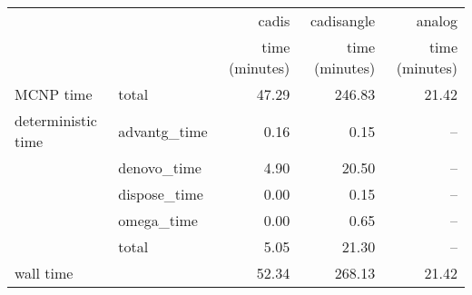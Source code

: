 \begin{tabular}{llrrr}
\toprule
          &              &          cadis &     cadisangle &         analog \\
          &              & time (minutes) & time (minutes) & time (minutes) \\
\midrule
MCNP time & total &          47.29 &         246.83 &          21.42 \\
deterministic time & advantg\_time &           0.16 &           0.15 &            -- \\
          & denovo\_time &           4.90 &          20.50 &            -- \\
          & dispose\_time &           0.00 &           0.15 &            -- \\
          & omega\_time &           0.00 &           0.65 &            -- \\
          & total &           5.05 &          21.30 &            -- \\
wall time &              &          52.34 &         268.13 &          21.42 \\
\bottomrule
\end{tabular}
